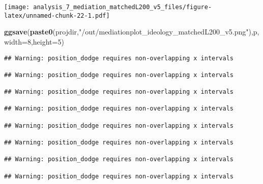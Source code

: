 \documentclass[
]{article}
\newenvironment{Shaded}{\begin{snugshade}}{\end{snugshade}}
\newcommand{\DataTypeTok}[1]{\textcolor[rgb]{0.13,0.29,0.53}{#1}}
\newcommand{\DecValTok}[1]{\textcolor[rgb]{0.00,0.00,0.81}{#1}}
\newcommand{\KeywordTok}[1]{\textcolor[rgb]{0.13,0.29,0.53}{\textbf{#1}}}
\newcommand{\NormalTok}[1]{#1}
\newcommand{\StringTok}[1]{\textcolor[rgb]{0.31,0.60,0.02}{#1}}
\begin{document}
\texttt{[image: analysis\_7\_mediation\_matchedL200\_v5\_files/figure-latex/unnamed-chunk-22-1.pdf]}

\begin{Shaded}
\begin{Highlighting}[]
\KeywordTok{ggsave}\NormalTok{(}\KeywordTok{paste0}\NormalTok{(projdir,}\StringTok{"/out/mediationplot_ideology_matchedL200_v5.png"}\NormalTok{),p,}\DataTypeTok{width=}\DecValTok{8}\NormalTok{,}\DataTypeTok{height=}\DecValTok{5}\NormalTok{)}
\end{Highlighting}
\end{Shaded}

\begin{verbatim}
## Warning: position_dodge requires non-overlapping x intervals

## Warning: position_dodge requires non-overlapping x intervals

## Warning: position_dodge requires non-overlapping x intervals

## Warning: position_dodge requires non-overlapping x intervals

## Warning: position_dodge requires non-overlapping x intervals

## Warning: position_dodge requires non-overlapping x intervals

## Warning: position_dodge requires non-overlapping x intervals

## Warning: position_dodge requires non-overlapping x intervals
\end{verbatim}
\end{document}
